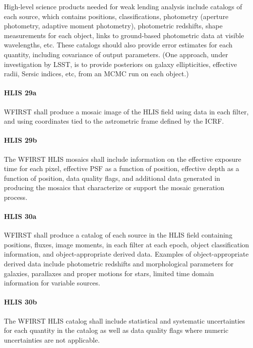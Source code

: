 High-level science products needed for weak lending analysis include catalogs of
each source, which contains positions, classifications, photometry (aperture
photometry, adaptive moment photometry), photometric redshifts, shape
measurements for each object, links to ground-based photometric data at visible
wavelengths, etc. These catalogs should also provide error estimates for each
quantity, including covariance of output parameters. (One approach, under
investigation by LSST, is to provide posteriors on galaxy ellipticities,
effective radii, Sersic indices, etc, from an MCMC run on each object.)

\paragraph{HLIS 29a} WFIRST shall produce a mosaic image of the HLIS field using data in
each filter, and using coordinates tied to the astrometric frame defined by the
ICRF.

\paragraph{HLIS 29b} The WFIRST HLIS mosaics shall include information on the effective
exposure time for each pixel, effective PSF as a function of position, effective
depth as a function of position, data quality flags, and additional data
generated in producing the mosaics that characterize or support the mosaic
generation process.

\paragraph{HLIS 30a} WFIRST shall produce a catalog of each source in the HLIS field
containing positions, fluxes, image moments, in each filter at each epoch,
object classification information, and object-appropriate derived data. Examples
of object-appropriate derived data include photometric redshifts and
morphological parameters for galaxies, parallaxes and proper motions for stars,
limited time domain information for variable sources.

\paragraph{HLIS 30b} The WFIRST HLIS catalog shall include statistical and systematic
uncertainties for each quantity in the catalog as well as data quality flags
where numeric uncertainties are not applicable.


